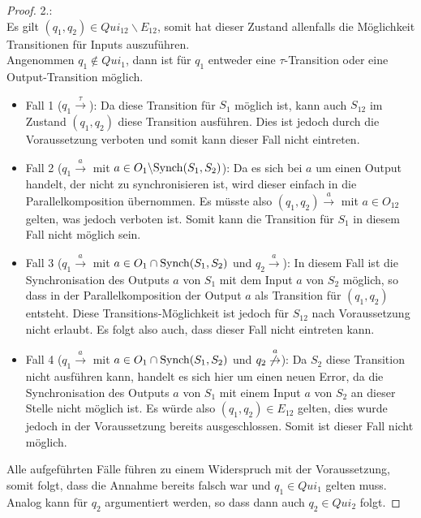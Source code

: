 \begin{proof}
  2.:\\
  Es gilt $(q_1,q_2)\in Qui_{12}\backslash E_{12}$, somit hat
  dieser Zustand allenfalls die Möglichkeit Transitionen für Inputs
  auszuführen.\\
  Angenommen $q_1\notin Qui_1$, dann ist für $q_1$ entweder eine
  $\tau$-Transition oder eine Output-Transition möglich.
  \begin{itemize}
    \item Fall 1 \big($q_1 \overset{\tau}{\rightarrow}$\big): Da diese Transition für
      $S_1$ möglich ist, kann auch $S_{12}$ im Zustand $(q_1,q_2)$ diese
      Transition ausführen. Dies ist jedoch durch die Voraussetzung verboten
      und somit kann dieser Fall nicht eintreten.
    \item Fall 2 \big($q_1 \overset{a}{\rightarrow}$ mit $a\in O_1\backslash
      \mathrm{Synch}(S_1,S_2)$\big): Da es sich bei $a$ um einen Output handelt, der nicht
      zu synchronisieren ist, wird dieser einfach in die Parallelkomposition
      übernommen. Es müsste also $(q_1,q_2) \overset{a}{\rightarrow}$  mit
      $a\in O_{12}$ gelten,
      was jedoch verboten ist. Somit kann die Transition für $S_1$ in diesem
      Fall nicht möglich sein.
    \item Fall 3 \big($q_1 \overset{a}{\rightarrow}$ mit $a\in O_1\cap
      \mathrm{Synch}(S_1,S_2)$ und $q_2 \overset{a}{\rightarrow}$\big): In diesem Fall ist
      die Synchronisation des Outputs $a$ von $S_1$ mit dem Input $a$ von $S_2$
      möglich, so dass in der Parallelkomposition der Output $a$ als Transition
      für $(q_1,q_2)$ entsteht. Diese Transitions-Möglichkeit ist jedoch für
      $S_{12}$ nach Voraussetzung nicht erlaubt. Es folgt also auch, dass
      dieser Fall nicht eintreten kann.
    \item Fall 4 \Big($q_1 \overset{a}{\rightarrow}$ mit $a\in O_1\cap
      \mathrm{Synch}(S_1,S_2)$ und $q_2
      \overset{a}{\not{\hspace{-0.1cm}\rightarrow}}$\Big):
      Da $S_2$ diese Transition nicht ausführen kann, handelt es sich hier um
      einen neuen Error, da die Synchronisation des Outputs $a$ von $S_1$ mit
      einem Input $a$ von $S_2$ an dieser Stelle nicht möglich
      ist. Es würde also $(q_1,q_2)\in E_{12}$ gelten, dies wurde jedoch in der
      Voraussetzung bereits ausgeschlossen. Somit ist dieser Fall nicht
      möglich.
  \end{itemize}
  Alle aufgeführten Fälle führen zu einem Widerspruch mit der Voraussetzung,
  somit folgt, dass die Annahme bereits falsch war und $q_1\in Qui_1$ gelten
  muss. Analog kann für $q_2$ argumentiert werden, so dass dann auch $q_2\in
  Qui_2$ folgt.
\end{proof}

